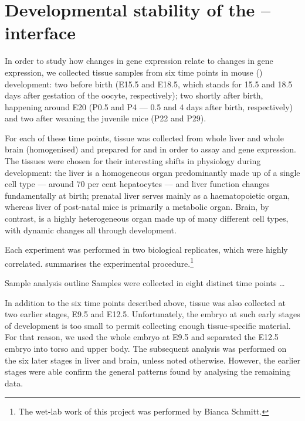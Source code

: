 \chapter{Developmental stability of the -- interface}

In order to study how changes in \mrna gene expression relate to changes in
\trna gene expression, we collected tissue samples from six time points in mouse
(\mmu) development: two before birth (E15.5 and E18.5, which stands for
\num{15.5} and \num{18.5} days after gestation of the oocyte, respectively); two
shortly after birth, happening around E20 (P0.5 and P4 --- \num{0.5} and \num{4}
days after birth, respectively) and two after weaning the juvenile mice (P22 and
P29).

For each of these time points, tissue was collected from whole liver and whole
brain (homogenised) and prepared for \rnaseq and  \chipseq in order to
assay \mrna and \trna gene expression. The tissues were chosen for their
interesting shifts in physiology during development: the liver is a homogeneous
organ predominantly made up of a single cell type --- around \num{70} per cent
hepatocytes --- and liver function changes fundamentally at birth;
prenatal liver serves mainly as a haematopoietic organ, whereas liver of
post-natal mice is primarily a metabolic organ. Brain, by contrast, is
a highly heterogeneous organ made up of many different cell types, with dynamic
changes all through development.

Each experiment was performed in two biological replicates, which were highly
correlated.  summarises the experimental
procedure.\footnote{The wet-lab work of this project was performed by Bianca
Schmitt.}

    {Sample analysis outline}
    {Samples were collected in eight distinct time points …}

In addition to the six time points described above, tissue was also collected at
two earlier stages, E9.5 and E12.5. Unfortunately, the embryo at such early
stages of development is too small to permit collecting enough tissue-specific
material. For that reason, we used the whole embryo at E9.5 and separated the
E12.5 embryo into torso and upper body. The subsequent analysis was performed on
the six later stages in liver and brain, unless noted otherwise. However, the earlier stages were able confirm the general
patterns found by analysing the remaining data.

